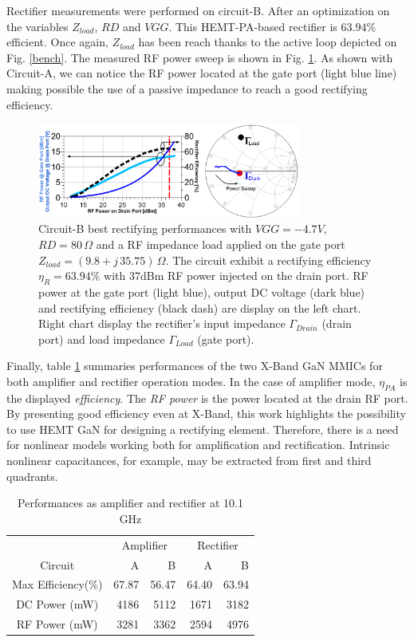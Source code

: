 \documentclass[conference]{IEEEtran}
\begin{document}
Rectifier measurements were performed on circuit-B. After an optimization on the variables $Z_{load}$, $RD$ and $VGG$. This HEMT-PA-based rectifier is $63.94\%$ efficient. Once again, $Z_{load}$ has been reach thanks to the active loop depicted on Fig. \ref{bench}. The measured RF power sweep is shown in Fig. \ref{scott_rect}. As shown with Circuit-A, we can notice the RF power located at the gate port (light blue line) making possible the use of a passive impedance to reach a good rectifying efficiency.

\begin{figure}[ht!] %
\centering
\includegraphics[width=3.4in]{IMS2014_Scott_Rectifier.pdf}
\caption{ Circuit-B best rectifying performances with $VGG=-4.7V$, $RD=80\,\Omega$ and a RF impedance load applied on the gate port $Z_{load}=(9.8 + j\,35.75)\,\Omega$. The circuit exhibit a rectifying efficiency $\eta_R=63.94\%$ with 37dBm RF power injected on the drain port. RF power  at the gate port (light blue), output DC voltage (dark blue) and rectifying efficiency (black dash) are display on the left chart. Right chart display the rectifier's input impedance $\Gamma_{Drain}$ (drain port) and load impedance $\Gamma_{Load}$ (gate port).
 }
\label{scott_rect}
\end{figure}

Finally, table \ref{tab:hresult} summaries performances of the two X-Band GaN MMICs for both amplifier and rectifier operation modes. In the case of amplifier mode, $\eta_{PA}$ is the displayed \textit{efficiency}. The \textit{RF power} is the power located at the drain RF port.
By presenting good efficiency even at X-Band, this work highlights the possibility to use HEMT GaN for designing a rectifying element. Therefore, there is a need for nonlinear models working both for amplification and rectification. Intrinsic nonlinear capacitances, for example, may  be extracted from first and third quadrants.

\begin{table}[ht]
\caption{Performances as amplifier and rectifier at 10.1 GHz} %
\centering %
\begin{tabular}{c| rr | rr  } %
\hline\hline %
 &\multicolumn{2}{c}{Amplifier} & \multicolumn{2}{c}{Rectifier}\\
Circuit &A&B&A&B\\ [0.25ex]
\hline
Max Efficiency(\%) & 67.87 & 56.47 & 64.40 & 63.94 \\
DC Power (mW) & 4186 & 5112 & 1671 & 3182\\
 RF Power (mW) & 3281 & 3362 & 2594 & 4976\\
\hline\hline
\end{tabular}
\label{tab:hresult}
\end{table}
\end{document}
